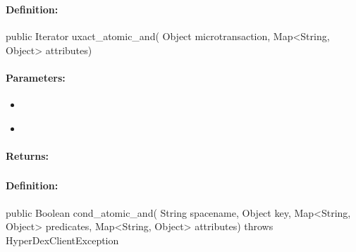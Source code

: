 \subsubsection{}
\label{api:java:uxact_atomic_and}


\paragraph{Definition:}
\begin{javacode}
public Iterator uxact_atomic_and(
        Object microtransaction,
        Map<String, Object> attributes)
\end{javacode}

\paragraph{Parameters:}
\begin{itemize}[noitemsep]
\item {}\\

\item {}\\

\end{itemize}

\paragraph{Returns:}


\pagebreak
\subsubsection{}
\label{api:java:cond_atomic_and}


\paragraph{Definition:}
\begin{javacode}
public Boolean cond_atomic_and(
        String spacename,
        Object key,
        Map<String, Object> predicates,
        Map<String, Object> attributes) throws HyperDexClientException
\end{javacode}

